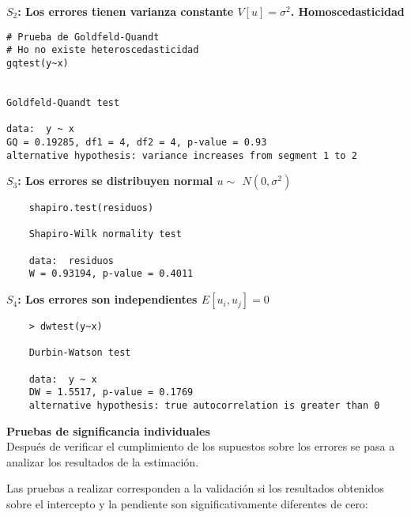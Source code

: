\documentclass[base=hide,12pt]{elegantbook}
\begin{document}
\textcolor{col3}{\bf $S_2$: Los errores tienen varianza constante $V[u]=\sigma^{2}$. Homoscedasticidad}\\

\begin{Box3}{}
\begin{verbatim}	
# Prueba de Goldfeld-Quandt
# Ho no existe heteroscedasticidad
gqtest(y~x)


Goldfeld-Quandt test

data:  y ~ x
GQ = 0.19285, df1 = 4, df2 = 4, p-value = 0.93
alternative hypothesis: variance increases from segment 1 to 2
\end{verbatim}
\end{Box3}
\vspace{1cm}

\textcolor{col3}{\bf $S_3$: Los errores se distribuyen normal $u\sim$ $N(0,\sigma^{2})$}\\
\begin{Box3}{}
\begin{verbatim}
	shapiro.test(residuos)
	
	Shapiro-Wilk normality test
	
	data:  residuos
	W = 0.93194, p-value = 0.4011
\end{verbatim}	
	
\end{Box3}
\vspace{1cm}

\textcolor{col3}{\bf $S_4$: Los errores son independientes $E[u_i,u_j]=0$}\\
\begin{Box3}{}
\begin{verbatim}
	> dwtest(y~x)
	
	Durbin-Watson test
	
	data:  y ~ x
	DW = 1.5517, p-value = 0.1769
	alternative hypothesis: true autocorrelation is greater than 0
\end{verbatim}	
	
\end{Box3}
\vspace{1cm}
\textcolor{col3}{\bf \large Pruebas de significancia individuales}\\
Después de verificar el cumplimiento de los supuestos sobre los errores se pasa a analizar los resultados de la estimación.

Las pruebas a realizar corresponden a la validación si los resultados obtenidos sobre el intercepto y la pendiente son significativamente diferentes de cero:\\
\end{document}
